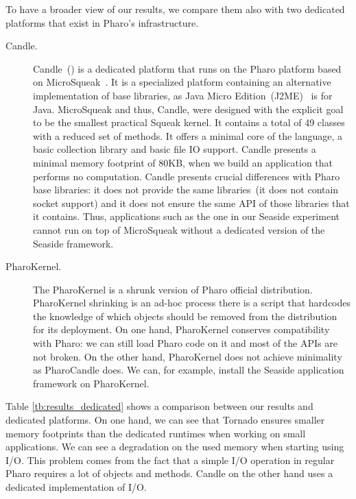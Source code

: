 To have a broader view of our results, we compare them also with two dedicated platforms that exist in Pharo's infrastructure.

\begin{description}
\item[Candle.] Candle~() is a dedicated platform that runs on the Pharo platform based on MicroSqueak~\cite{Malo11a}. It is a specialized platform containing an alternative implementation of base libraries, as Java Micro Edition~(J2ME)~\cite{JavaME} is for Java. MicroSqueak and thus, Candle, were designed with the explicit goal to be the smallest practical Squeak kernel. It contains a total of 49 classes with a reduced set of methods. It offers a minimal core of the language, a basic collection library and basic file IO support. Candle presents a minimal memory footprint of 80KB, when we build an application that performs no computation.
Candle presents crucial differences with Pharo base libraries: it does not provide the same libraries~(\eg it does not contain socket support) and it does not ensure the same API of those libraries that it contains. Thus, applications such as the one in our Seaside experiment cannot run on top of MicroSqueak without a dedicated version of the Seaside framework.

\item[PharoKernel.] The PharoKernel is a shrunk version of Pharo official distribution. PharoKernel shrinking is an ad-hoc process \ie there is a script that hardcodes the knowledge of which objects should be removed from the distribution for its deployment. On one hand, PharoKernel conserves compatibility with Pharo: we can still load Pharo code on it and most of the APIs are not broken. On the other hand, PharoKernel does not achieve minimality as PharoCandle does. We can, for example, install the Seaside application framework on PharoKernel.

\end{description}

Table \ref{tb:results_dedicated} shows a comparison between our results and dedicated platforms. On one hand, we can see that Tornado ensures smaller memory footprints than the dedicated runtimes when working on small applications. We can see a degradation on the used memory when starting using I/O. This problem comes from the fact that a simple I/O operation in regular Pharo requires a lot of objects and methods. Candle on the other hand uses a dedicated implementation of I/O.

